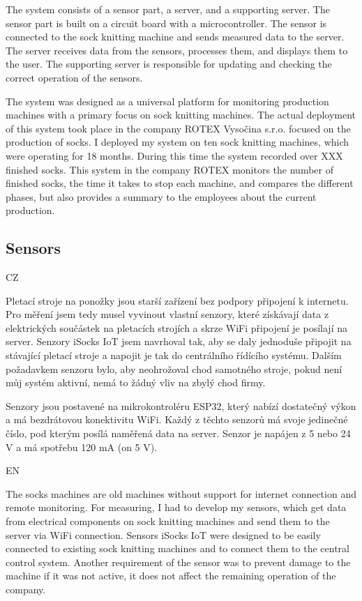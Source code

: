 \documentclass[12pt, a4paper]{article}
\begin{document}
The system consists of a sensor part, a server, and a supporting server.
The sensor part is built on a circuit board with a microcontroller.
The sensor is connected to the sock knitting machine and sends measured data to the server.
The server receives data from the sensors, processes them, and displays them to the user.
The supporting server is responsible for updating and checking the correct operation of the sensors.

The system was designed as a universal platform for monitoring production machines with a primary focus on sock knitting machines.
The actual deployment of this system took place in the company ROTEX Vysočina s.r.o. focused on the production of socks.
I deployed my system on ten sock knitting machines, which were operating for 18 months.
During this time the system recorded over XXX finished socks.
This system in the company ROTEX monitors the number of finished socks, the time it takes to stop each machine, and compares the different phases, but also provides a summary to the employees about the current production.


\subsection*{Sensors}
CZ

Pletací stroje na ponožky jsou starší zařízení bez podpory připojení k internetu.
Pro měření jsem tedy musel vyvinout vlastní  senzory, které získávají data z elektrických součástek na pletacích  strojích a skrze WiFi připojení je posílají  na server.
Senzory iSocks IoT jsem navrhoval tak, aby se daly jednoduše připojit na stávající pletací stroje a napojit je tak do centrálního řídícího systému.
Dalším požadavkem senzoru bylo, aby neohrožoval chod samotného stroje, pokud není můj systém aktivní, nemá to žádný vliv na zbylý chod firmy.

Senzory jsou postavené na mikrokontroléru ESP32, který nabízí dostatečný výkon a má bezdrátovou konektivitu WiFi.
Každý z těchto senzorů má svoje jedinečné číslo, pod kterým posílá naměřená data na server.
Senzor je napájen z 5 nebo 24 V a má spotřebu 120 mA (on 5 V).

EN

The socks machines are old machines without support for internet connection and remote monitoring.
For measuring, I had to develop my sensors, which get data from electrical components on sock knitting machines and send them to the server via WiFi connection.
Sensors iSocks IoT were designed to be easily connected to existing sock knitting machines and to connect them to the central control system.
Another requirement of the sensor was to prevent damage to the machine if it was not active, it does not affect the remaining operation of the company.
\end{document}
